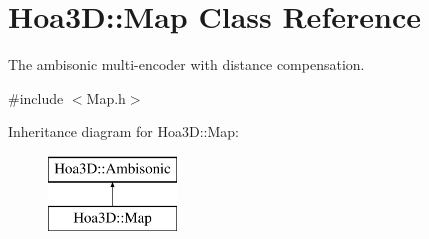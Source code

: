 \hypertarget{class_hoa3_d_1_1_map}{\section{Hoa3\-D\-:\-:Map Class Reference}
\label{class_hoa3_d_1_1_map}
}


The ambisonic multi-\/encoder with distance compensation.  




{\ttfamily \#include $<$Map.\-h$>$}

Inheritance diagram for Hoa3\-D\-:\-:Map\-:\begin{figure}[H]
\begin{center}
\leavevmode
\includegraphics[height=2.000000cm]{class_hoa3_d_1_1_map}
\end{center}
\end{figure}
